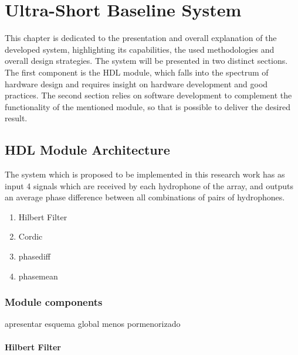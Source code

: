 \chapter{Ultra-Short Baseline System} \label{chap:proposed_sys}

This chapter is dedicated to the presentation and overall explanation of the developed system, highlighting its capabilities, the used methodologies and overall design strategies. 
The system will be presented in two distinct sections. The first component is the HDL module, which falls into the spectrum of hardware design and requires insight on hardware development and good practices. The second section relies on software development to complement the functionality of the mentioned module, so that is possible to deliver the desired result.

\section{HDL Module Architecture} \label{subchap:HDL module}

The system which is proposed to be implemented in this research work has as input 4 signals which are received by each hydrophone of the array, and outputs an average phase difference between all combinations of pairs of hydrophones. 



\begin{enumerate}
	\item Hilbert Filter
	\item Cordic
	\item phasediff
	\item phasemean
\end{enumerate}

\subsection{Module components}

apresentar esquema global menos pormenorizado

\subsubsection{Hilbert Filter}


